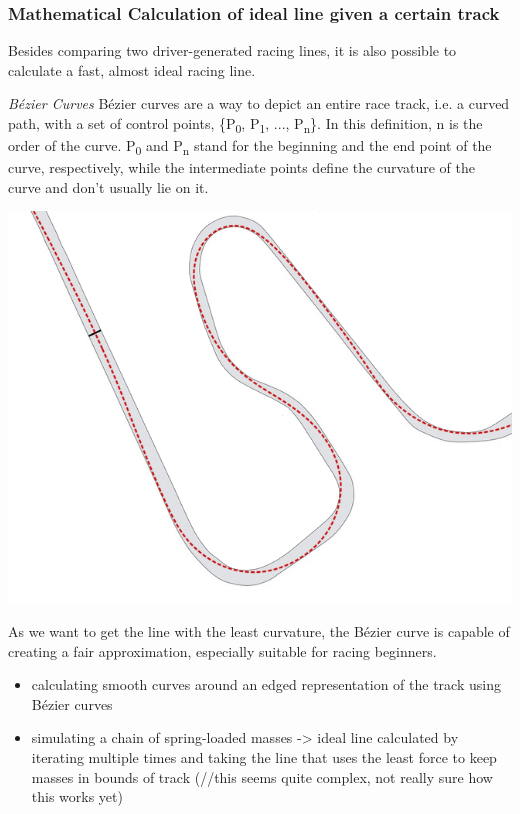 \subsubsection{Mathematical Calculation of ideal line given a certain track}
Besides comparing two driver-generated racing lines, it is also possible to calculate a fast, almost ideal racing line.

\textit{Bézier Curves}
Bézier curves are a way to depict an entire race track, i.e. a curved path, with a set of control points, \{P\textsubscript{0}, P\textsubscript{1}, ..., P\textsubscript{n}\}. In this definition, n is the order of the curve. P\textsubscript{0} and P\textsubscript{n} stand for the beginning and the end point of the curve, respectively, while the intermediate points define the curvature of the curve and don't usually lie on it.

\includegraphics[width=\textwidth]{bezier_track}

As we want to get the line with the least curvature, the Bézier curve is capable of creating a fair approximation, especially suitable for racing beginners.
\begin{itemize}
  \item calculating smooth curves around an edged representation of the track using Bézier curves
  \item simulating a chain of spring-loaded masses -> ideal line calculated by iterating multiple times and taking the line that uses the least force to keep masses in bounds of track (//this seems quite complex, not really sure how this works yet)
\end{itemize}

